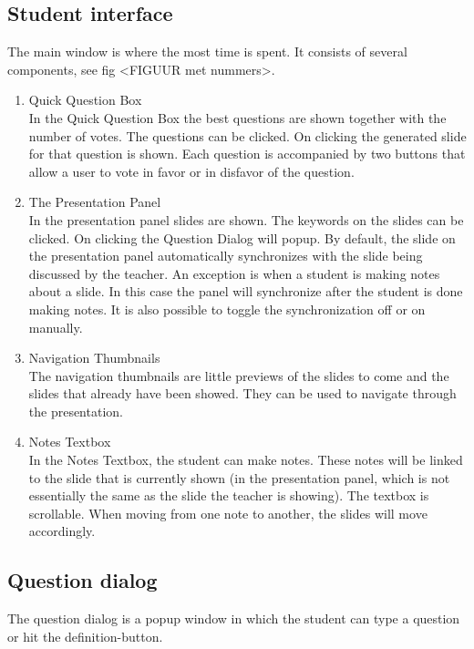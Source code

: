 \documentclass[11pt]{article}
\begin{document}
\subsection{Student interface}
The main window is where the most time is spent. It consists of several components, see fig <FIGUUR met nummers>.%
\begin{enumerate}
\item Quick Question Box\\
In the Quick Question Box the best questions are shown together with the number of votes. The questions can be clicked. On clicking the generated slide for that question is shown. Each question is accompanied by two buttons that allow a user to vote in favor or in disfavor of the question. 
\item The Presentation Panel\\
In the presentation panel slides are shown. The keywords on the slides can be clicked. On clicking the Question Dialog will popup. By default, the slide on the presentation panel automatically synchronizes with the slide being discussed by the teacher. An exception is when a student is making notes about a slide. In this case the panel will synchronize after the student is done making notes. It is also possible to toggle the synchronization off or on manually.  
\item Navigation Thumbnails\\
The navigation thumbnails are little previews of the slides to come and the slides that already have been showed. They can be used to navigate through the presentation.
\item Notes Textbox\\
In the Notes Textbox, the student can make notes. These notes will be linked to the slide that is currently shown (in the presentation panel, which is not essentially the same as the slide the teacher is showing). The textbox is scrollable. When moving from one note to another, the slides will move accordingly. 
\end{enumerate}

\subsection{Question dialog}
The question dialog is a popup window in which the student can type a question or hit the definition-button.
\end{document}
